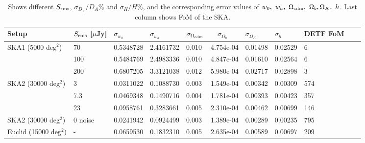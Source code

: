 \documentclass[useAMS,usenatbib]{mn2e}
\begin{document}
\begin{table}
\caption{Shows different $S_{\rm rms}$, $\sigma_{D_A}/{D_A} \%$ and $\sigma_{H}/H \%$, and  the corresponding error values of $w_0, \  w_a, \ \Omega_{{\rm cdm}}, \ \Omega_b,\Omega_K,\  h$. Last column shows FoM of the SKA.}
\begin{tabular}{ |l|l|l|l|l|l||l||l|l|l|l|}
\hline
\hline 
\multirow{1}{*}{Setup}& $S_{\rm rms}$  [$\mu$Jy]  & $\sigma_{w_0}$ &  $\sigma_{w_a}$ &  $\sigma_{\Omega_{{\rm cdm}}} $ & $\quad \sigma_{\Omega_b}$ & $ \sigma_{\Omega_K} $ & $\sigma_{h}$ & DETF FoM \\
\hline
\multirow{1}{*}{SKA1 (5000 deg$^2$)}
  & 70  & 0.5348728 & 2.4161732 & 0.010 & 4.754e-04 & 0.01498 & 0.02529 & 6  \\
 & 100 & 0.5484769 & 2.4983336 & 0.010 & 4.847e-04 & 0.01610 & 0.02564 & 6  \\
  & 200 & 0.6807205 & 3.3121038 & 0.012 & 5.980e-04 & 0.02717 & 0.02898 & 3  \\
\hline
\multirow{3}{*}{SKA2 (30000 deg$^2$)}
  & 3 & 0.0311022 & 0.1088730 & 0.003 & 1.549e-04 & 0.00342 & 0.00309 & 574  \\
   &7.3& 0.0469348 & 0.1490716 & 0.004 & 1.781e-04 & 0.00393 & 0.00423 & 357  \\
  & 23& 0.0958761 & 0.3283661 & 0.005 & 2.310e-04 & 0.00462 & 0.00699 & 146  \\
  \hline
  \hline
\multirow{1}{*}{SKA2 (30000 deg$^2$)}
 & 0 noise & 0.0241942 & 0.0924499 & 0.003 & 1.389e-04 & 0.00289 & 0.00235 & 795  \\

  \hline

\multirow{1}{*}{Euclid (15000 deg$^2$)}
 & - & 0.0659530 & 0.1832310 & 0.005 & 2.635e-04 & 0.00589 & 0.00697 & 209  \\
\hline
\end{tabular}
\label{Table1:summary-wa-w0_all}
\end{table}

 
\end{document}
